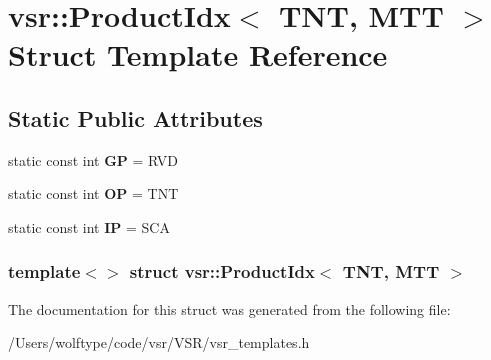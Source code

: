 \hypertarget{structvsr_1_1_product_idx_3_01_t_n_t_00_01_m_t_t_01_4}{\section{vsr\-:\-:Product\-Idx$<$ T\-N\-T, M\-T\-T $>$ Struct Template Reference}
\label{structvsr_1_1_product_idx_3_01_t_n_t_00_01_m_t_t_01_4}
}
\subsection*{Static Public Attributes}
\begin{DoxyCompactItemize}
\item 
\hypertarget{structvsr_1_1_product_idx_3_01_t_n_t_00_01_m_t_t_01_4_afb3c35002542be319c669f9175c91611}{static const int {\bfseries G\-P} = R\-V\-D}\label{structvsr_1_1_product_idx_3_01_t_n_t_00_01_m_t_t_01_4_afb3c35002542be319c669f9175c91611}

\item 
\hypertarget{structvsr_1_1_product_idx_3_01_t_n_t_00_01_m_t_t_01_4_a130325adedd65d3118df33733b40c60c}{static const int {\bfseries O\-P} = T\-N\-T}\label{structvsr_1_1_product_idx_3_01_t_n_t_00_01_m_t_t_01_4_a130325adedd65d3118df33733b40c60c}

\item 
\hypertarget{structvsr_1_1_product_idx_3_01_t_n_t_00_01_m_t_t_01_4_ae3e3b8126766cf87d3e11d1a2b9dbafa}{static const int {\bfseries I\-P} = S\-C\-A}\label{structvsr_1_1_product_idx_3_01_t_n_t_00_01_m_t_t_01_4_ae3e3b8126766cf87d3e11d1a2b9dbafa}

\end{DoxyCompactItemize}
\subsubsection*{template$<$$>$ struct vsr\-::\-Product\-Idx$<$ T\-N\-T, M\-T\-T $>$}



The documentation for this struct was generated from the following file\-:\begin{DoxyCompactItemize}
\item 
/\-Users/wolftype/code/vsr/\-V\-S\-R/vsr\-\_\-templates.\-h\end{DoxyCompactItemize}
